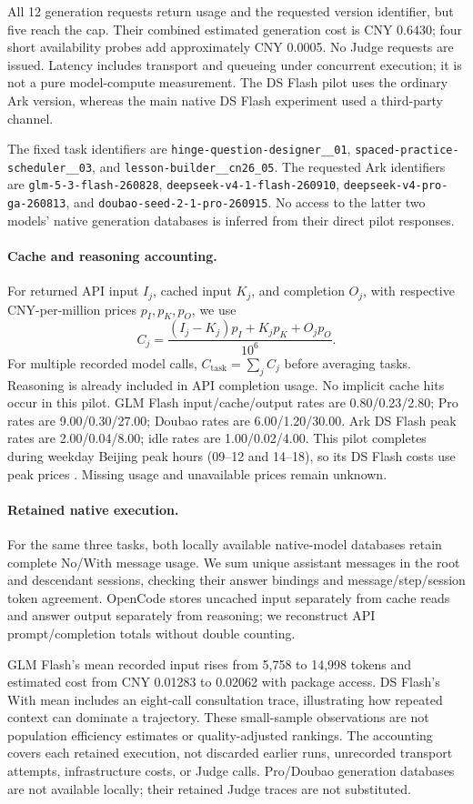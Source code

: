 All 12 generation requests return usage and the requested version identifier,
but five reach the cap. Their combined estimated generation cost is CNY
0.6430; four short availability probes add approximately CNY 0.0005.
No Judge requests are issued. Latency includes transport and queueing under
concurrent execution; it is not a pure model-compute measurement.
The DS Flash pilot uses the ordinary Ark version, whereas the main native
DS Flash experiment used a third-party channel.

The fixed task identifiers are
\texttt{hinge-question-designer\_\_01},
\texttt{spaced-practice-scheduler\_\_03}, and
\texttt{lesson-builder\_\_cn26\_05}.
The requested Ark identifiers are \texttt{glm-5-3-flash-260828},
\texttt{deepseek-v4-1-flash-260910},
\texttt{deepseek-v4-pro-ga-260813}, and
\texttt{doubao-seed-2-1-pro-260915}. No access to the latter two models'
native generation databases is inferred from their direct pilot responses.

\paragraph{Cache and reasoning accounting.}
For returned API input $I_j$, cached input $K_j$, and completion $O_j$, with
respective CNY-per-million prices $p_I,p_K,p_O$, we use
\begin{equation}
C_j=\frac{(I_j-K_j)p_I+K_jp_K+O_jp_O}{10^6}.
\end{equation}
For multiple recorded model calls, $C_{\mathrm{task}}=\sum_j C_j$ before
averaging tasks. Reasoning is already included in API completion usage.
No implicit cache hits occur in this pilot. GLM Flash input/cache/output
rates are 0.80/0.23/2.80; Pro rates are 9.00/0.30/27.00; Doubao rates are
6.00/1.20/30.00. Ark DS Flash peak rates are 2.00/0.04/8.00; idle rates
are 1.00/0.02/4.00. This pilot completes during weekday Beijing peak hours
(09--12 and 14--18), so its DS Flash costs use peak prices
\citep{arkpricing}. Missing usage and unavailable prices remain unknown.

\paragraph{Retained native execution.}
For the same three tasks, both locally available native-model databases
retain complete No/With message usage. We sum unique assistant messages in
the root and descendant sessions, checking their answer bindings and
message/step/session token agreement. OpenCode stores uncached input
separately from cache reads and answer output separately from reasoning;
we reconstruct API prompt/completion totals without double counting.

GLM Flash's mean recorded input rises from 5,758 to 14,998 tokens and estimated
cost from CNY 0.01283 to 0.02062 with package access. DS Flash's With mean
includes an eight-call consultation trace, illustrating how repeated context
can dominate a trajectory. These small-sample observations are not population
efficiency estimates or quality-adjusted rankings. The accounting covers each
retained execution, not discarded earlier runs, unrecorded transport attempts,
infrastructure costs, or Judge calls. Pro/Doubao generation databases are not
available locally; their retained Judge traces are not substituted.
